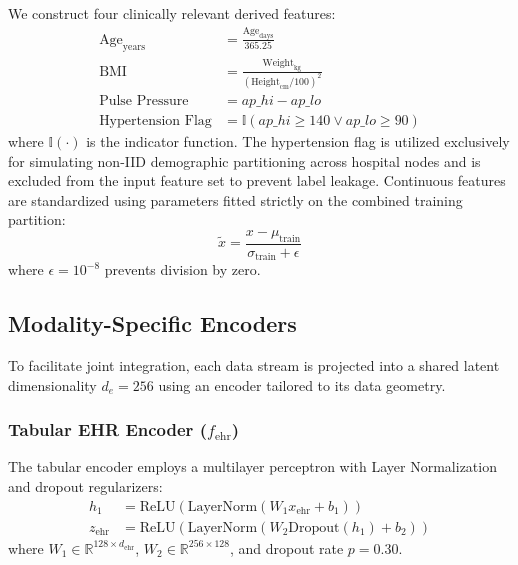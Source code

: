 \documentclass[10pt,conference]{IEEEtran}
\begin{document}
We construct four clinically relevant derived features:
\begin{align}
    \text{Age}_{\mathrm{years}} &= \frac{\text{Age}_{\mathrm{days}}}{365.25} \\
    \text{BMI} &= \frac{\text{Weight}_{\mathrm{kg}}}{(\text{Height}_{\mathrm{cm}} / 100)^2} \\
    \text{Pulse Pressure} &= ap\_hi - ap\_lo \\
    \text{Hypertension Flag} &= \mathbb{I}(ap\_hi \ge 140 \lor ap\_lo \ge 90)
\end{align}
where $\mathbb{I}(\cdot)$ is the indicator function. The hypertension flag is utilized exclusively for simulating non-IID demographic partitioning across hospital nodes and is excluded from the input feature set to prevent label leakage. Continuous features are standardized using parameters fitted strictly on the combined training partition:
\begin{equation}
    \tilde{x} = \frac{x - \mu_{\mathrm{train}}}{\sigma_{\mathrm{train}} + \epsilon}
\end{equation}
where $\epsilon = 10^{-8}$ prevents division by zero.

\subsection{Modality-Specific Encoders}
To facilitate joint integration, each data stream is projected into a shared latent dimensionality $d_e = 256$ using an encoder tailored to its data geometry.

\subsubsection{Tabular EHR Encoder ($f_{\mathrm{ehr}}$)}
The tabular encoder employs a multilayer perceptron with Layer Normalization and dropout regularizers:
\begin{align}
    h_1 &= \text{ReLU}(\text{LayerNorm}(W_1 x_{\mathrm{ehr}} + b_1)) \\
    z_{\mathrm{ehr}} &= \text{ReLU}(\text{LayerNorm}(W_2 \text{Dropout}(h_1) + b_2))
\end{align}
where $W_1 \in \mathbb{R}^{128 \times d_{\mathrm{ehr}}}$, $W_2 \in \mathbb{R}^{256 \times 128}$, and dropout rate $p = 0.30$.
\end{document}
